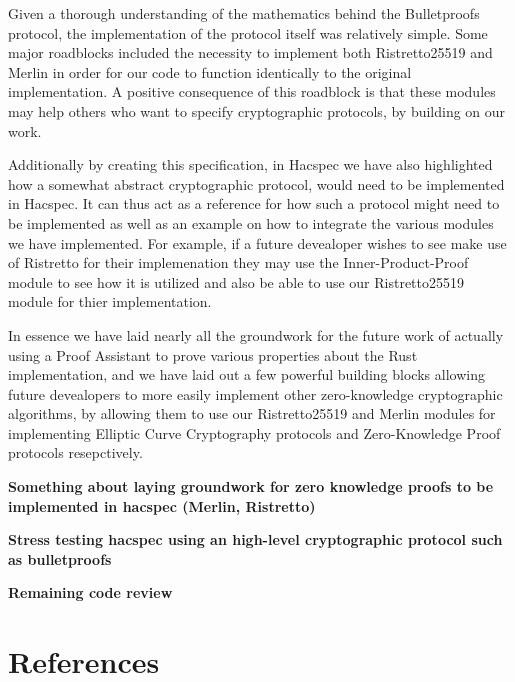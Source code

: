 \documentclass{article}
\begin{document}
Given a thorough understanding of the mathematics behind the
Bulletproofs protocol, the implementation of the protocol itself was
relatively simple. Some major roadblocks included the necessity to 
implement both Ristretto25519 and Merlin in order for our code to
function identically to the original implementation. 
A positive consequence of this roadblock is that these modules may 
help others who want to specify cryptographic protocols, by building 
on our work.

Additionally by creating this specification, in Hacspec we have also 
highlighted how a somewhat abstract cryptographic protocol, would need 
to be implemented in Hacspec. It can thus act as a reference for how 
such a protocol might need to be implemented as well as an example on 
how to integrate the various modules we have implemented. For example, 
if a future devealoper wishes to see make use of Ristretto for their 
implemenation they may use the Inner-Product-Proof module to see 
how it is utilized and also be able to use our Ristretto25519 
module for thier implementation. 

In essence we have laid nearly all the groundwork for the future work
of actually using a Proof Assistant to prove various properties about
the Rust implementation, and we have laid out a few powerful 
building blocks allowing future devealopers to more easily implement 
other zero-knowledge cryptographic algorithms, by allowing them to use 
our Ristretto25519 and Merlin modules for implementing Elliptic Curve 
Cryptography protocols and Zero-Knowledge Proof protocols resepctively.


\textbf{Something about laying groundwork for zero knowledge proofs to be implemented in hacspec (Merlin, Ristretto)}

\textbf{Stress testing hacspec using an high-level cryptographic protocol such as bulletproofs}

\textbf{Remaining code review}

\section{References}
\printbibliography
\end{document}
